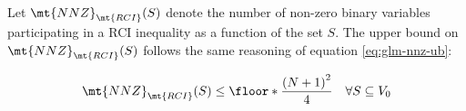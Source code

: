 Let $\mt{NNZ}_{\mt{RCI}}(S)$ denote the number of non-zero binary variables participating in a RCI inequality as a function of the set $S$.
The upper bound on $\mt{NNZ}_{\mt{RCI}}(S)$ follows the same reasoning of equation \eqref{eq:glm-nnz-ub}:

\begin{equation}\label{eq:rc-nnz-ub}
	\mt{NNZ}_{\mt{RCI}}(S) \le \floor*{\frac{\left( N + 1\right)^2}{4}} \quad \forall S \subseteq V_0
\end{equation}
